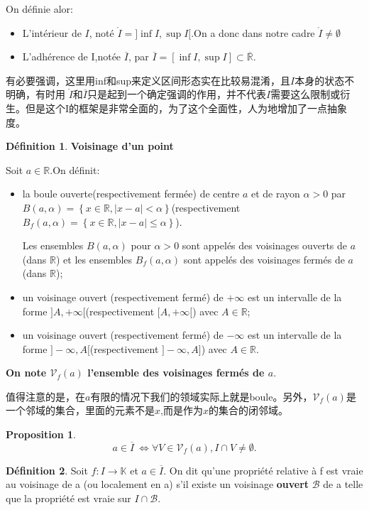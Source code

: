 \documentclass[12pt]{book}
\theoremstyle{definition}\newtheorem{dfn}{Définition}[chapter]
\theoremstyle{plain}\newtheorem{thm}{Théorème}[chapter]
\theoremstyle{plain}\newtheorem{prp}{Proposition}[chapter]
\theoremstyle{plain}\newtheorem{lem}{\bf Lemme}[chapter]
\theoremstyle{plain}\newtheorem{axm}{\bf Axiome}[chapter]
\theoremstyle{plain}\newtheorem{lmm}{\bf Lemme}[chapter]
\theoremstyle{plain}\newtheorem{exm}{\bf Example}[chapter]
\theoremstyle{plain}\newtheorem{cor}{\bf Corollaire}[chapter]
\theoremstyle{remark}\newtheorem{rem}{Remarque}[chapter]
\begin{document}
On définie alor:
\begin{itemize}
\item L'intérieur de $I$, noté $\mathring{I}=]\inf I,\sup I[$.On a donc dans notre cadre $\mathring{I}\not = \emptyset$
\item L'adhérence de I,notée $\overline{I}$, par $\overline{I}=[\inf I,\sup I]\subset \overline{\mathbb{R}}.$
\end{itemize}
有必要强调，这里用inf和sup来定义区间形态实在比较易混淆，且$I$本身的状态不明确，有时用 $\mathring{I}$和$\overline{I}$只是起到一个确定强调的作用，并不代表$I$需要这么限制或衍生。但是这个I的框架是非常全面的，为了这个全面性，人为地增加了一点抽象度。
\begin{dfn}{\textbf{Voisinage d'un point}}

Soit $a\in \mathbb{R}$.On définit:
\begin{itemize}
        \item  la boule ouverte(respectivement fermée) de centre $a$ et de rayon $\alpha >0$ par $
        B(a,\alpha)=\left\{x\in \mathbb{R},|x-a|< \alpha\right\}$(respectivement $
        B_f(a,\alpha)=\left\{x\in \mathbb{R},|x-a|\le \alpha\right\}$).

        Les ensembles  $
        B(a,\alpha)$ pour $\alpha>0$ sont appelés des voisinages ouverts de $a$ (dans $\mathbb{R}$) et les ensembles $	B_f(a,\alpha)$ sont appelés des voisinages fermés de $a$ (dans $\mathbb{R}$);
        \item un voisinage ouvert (respectivement fermé)
        de $+\infty$ est un intervalle de la forme $]A,+\infty[$(respectivement $[A,+\infty[$) avec $A\in \mathbb{R}$;
                \item un voisinage ouvert (respectivement fermé)
        de $-\infty$ est un intervalle de la forme $]-\infty,A[$(respectivement $]-\infty,A]$) avec $A\in \mathbb{R}$.

\end{itemize}
\textbf{On note $\mathcal{V}_f(a)$ l'ensemble des voisinages fermés de $a$}.
\end{dfn}
值得注意的是，在$a$有限的情况下我们的领域实际上就是boule。另外，$\mathcal{V}_f(a)$是一个邻域的集合，里面的元素不是$x$,而是作为$x$的集合的闭邻域。
\begin{prp}
        $$
        a\in \overline{I}\ \Leftrightarrow \forall V\in \mathcal{V}_f(a),I\cap V\not =\emptyset.
        $$
\end{prp}
\begin{dfn}
Soit $f : I\rightarrow \mathbb{K}$ et $a \in \overline{I}$. On dit qu'une propriété relative à f est vraie au voisinage de a (ou localement en a) s'il existe un voisinage \textbf{ouvert} $\mathcal{B}$ de a telle que la propriété est vraie sur $I \cap \mathcal{B}$.
\end{dfn}
\end{document}
